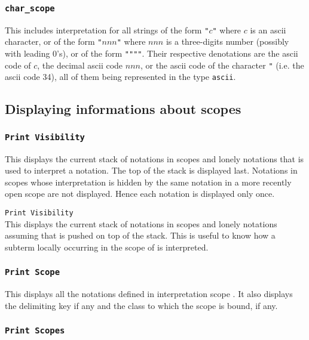 \subsubsection{\tt char\_scope}

This includes interpretation for all strings of the form
\verb!"!$c$\verb!"! where $c$ is an ascii character, or of the form
\verb!"!$nnn$\verb!"! where $nnn$ is a three-digits number (possibly
with leading 0's), or of the form \verb!""""!. Their respective
denotations are the ascii code of $c$, the decimal ascii code $nnn$,
or the ascii code of the character \verb!"! (i.e. the ascii code
34), all of them being represented in the type {\tt ascii}.

\subsection{Displaying informations about scopes}

\subsubsection{\tt Print Visibility}

This displays the current stack of notations in scopes and lonely
notations that is used to interpret a notation. The top of the stack
is displayed last. Notations in scopes whose interpretation is hidden
by the same notation in a more recently open scope are not
displayed. Hence each notation is displayed only once.

\variant

{\tt Print Visibility {\scope}}\\

This displays the current stack of notations in scopes and lonely
notations assuming that {\scope} is pushed on top of the stack.  This
is useful to know how a subterm locally occurring in the scope of
{\scope} is interpreted.

\subsubsection{\tt Print Scope {\scope}}

This displays all the notations defined in interpretation scope
{\scope}.  It also displays the delimiting key if any and the class to
which the scope is bound, if any.

\subsubsection{\tt Print Scopes}

